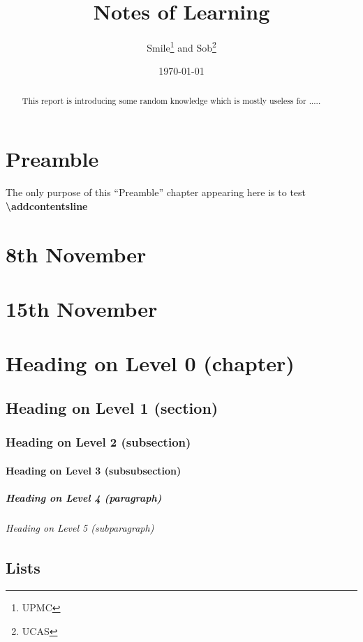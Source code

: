 \documentclass[a4paper, 11pt, twoside]{report}
\title{Notes of Learning \LaTeXe}
\author{Smile\thanks{UPMC} and Sob\thanks{UCAS}}
\date{\today}
\begin{document}
\maketitle

\begin{abstract}
    This report is introducing some random knowledge which is mostly useless for 
    .....
\end{abstract}

\tableofcontents

\chapter*{Preamble}
The only purpose of this ``Preamble'' chapter appearing here is to test 
\textbf{\textbackslash addcontentsline}

\chapter{8th November}

\chapter{15th November}


\blinddocument

\chapter{Heading on Level 0 (chapter)}
\blindtext
\section{Heading on Level 1 (section)}
\blindtext
\subsection{Heading on Level 2 (subsection)}
\blindtext
\subsubsection{Heading on Level 3 (subsubsection)}
\blindtext
\paragraph{Heading on Level 4 (paragraph)}
\blindtext
\subparagraph{Heading on Level 5 (subparagraph)}
\blindtext

\section{Lists}
\end{document}
